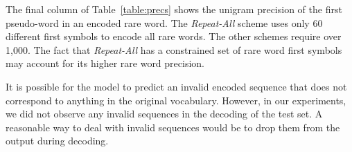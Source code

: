 The final column of Table~\ref{table:precs} shows the unigram precision of the
first pseudo-word in an encoded rare word. The \emph{Repeat-All} scheme uses
only 60 different first symbols to encode all rare words. The other schemes
require over 1,000. The fact that \emph{Repeat-All} has a constrained set of
rare word first symbols may account for its higher rare word precision.

It is possible for the model to predict an invalid encoded sequence that does
not correspond to anything in the original vocabulary. However, in our
experiments, we did not observe any invalid sequences in the decoding of the
test set. A reasonable way to deal with invalid sequences would be to drop them
from the output during decoding.

